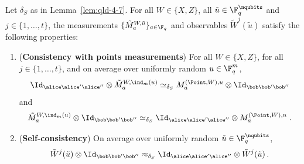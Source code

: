 \begin{lemma}
  \label{lem:qld-construct-the-paulis}
Let $\delta_S$ as in Lemma~\ref{lem:qld-4-7}.
For all $W \in \{X,Z\}$, all $\tilde{u} \in \F_q^\nqubits$ and $j \in \{1,\ldots,t\}$, the measurements $\{ \tilde{M}^{W,\tilde{u}}_a \}_{a \in \F_q}$ and observables $\tilde{W}^j(\tilde{u})$ satisfy the following properties:
\begin{enumerate}
\item (\textbf{Consistency with points measurements}) For all $W \in \{X,Z\}$, for all $j \in \{1,\ldots,t\}$, and on average over uniformly random $u \in \F_q^m$,
	\[
		\Id_{\alice \alice' \alice''} \otimes \tilde{M}^{W,\ind_m(u)}_a \simeq_{\delta_S} M^{(\Point,W),u}_a \otimes \Id_{\bob \bob' \bob''}
	\]
	and
	\[
		\tilde{M}^{W,\ind_m(u)}_a \otimes \Id_{\bob \bob' \bob''} \simeq_{\delta_S} \Id_{\alice \alice' \alice''} \otimes M^{(\Point,W),u}_a \;.
	\]	
	\item (\textbf{Self-consistency}) On average over uniformly random $\tilde{u} \in \F_q^\nqubits$,
	\[
		\tilde{W}^j(\tilde{u}) \otimes \Id_{\bob \bob' \bob''} \approx_{\delta_S} \Id_{\alice \alice' \alice''} \otimes \tilde{W}^j(\tilde{u})\,.
	\]
\end{enumerate}
\end{lemma}

